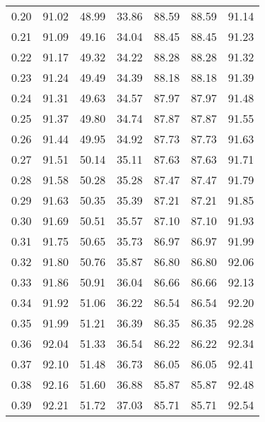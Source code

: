\begin{tabular}{|c|c|c|c|c|c|c|}
      0.20 &     91.02 &     48.99 &      33.86 &   88.59 &      88.59 &         91.14 \\
      0.21 &     91.09 &     49.16 &      34.04 &   88.45 &      88.45 &         91.23 \\
      0.22 &     91.17 &     49.32 &      34.22 &   88.28 &      88.28 &         91.32 \\
      0.23 &     91.24 &     49.49 &      34.39 &   88.18 &      88.18 &         91.39 \\
      0.24 &     91.31 &     49.63 &      34.57 &   87.97 &      87.97 &         91.48 \\
      0.25 &     91.37 &     49.80 &      34.74 &   87.87 &      87.87 &         91.55 \\
      0.26 &     91.44 &     49.95 &      34.92 &   87.73 &      87.73 &         91.63 \\
      0.27 &     91.51 &     50.14 &      35.11 &   87.63 &      87.63 &         91.71 \\
      0.28 &     91.58 &     50.28 &      35.28 &   87.47 &      87.47 &         91.79 \\
      0.29 &     91.63 &     50.35 &      35.39 &   87.21 &      87.21 &         91.85 \\
      0.30 &     91.69 &     50.51 &      35.57 &   87.10 &      87.10 &         91.93 \\
      0.31 &     91.75 &     50.65 &      35.73 &   86.97 &      86.97 &         91.99 \\
      0.32 &     91.80 &     50.76 &      35.87 &   86.80 &      86.80 &         92.06 \\
      0.33 &     91.86 &     50.91 &      36.04 &   86.66 &      86.66 &         92.13 \\
      0.34 &     91.92 &     51.06 &      36.22 &   86.54 &      86.54 &         92.20 \\
      0.35 &     91.99 &     51.21 &      36.39 &   86.35 &      86.35 &         92.28 \\
      0.36 &     92.04 &     51.33 &      36.54 &   86.22 &      86.22 &         92.34 \\
      0.37 &     92.10 &     51.48 &      36.73 &   86.05 &      86.05 &         92.41 \\
      0.38 &     92.16 &     51.60 &      36.88 &   85.87 &      85.87 &         92.48 \\
      0.39 &     92.21 &     51.72 &      37.03 &   85.71 &      85.71 &         92.54 \\

\end{tabular}

